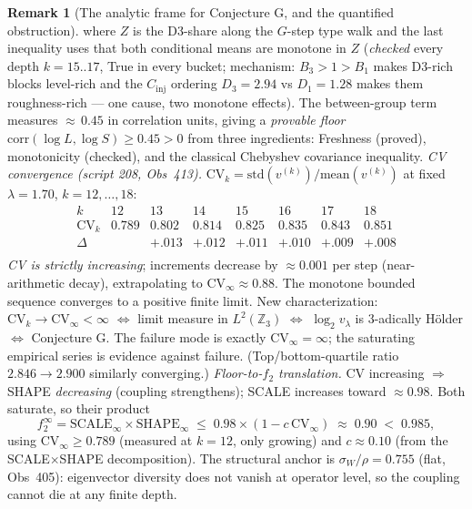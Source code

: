 \documentclass[11pt]{article}
\theoremstyle{definition}
\newtheorem{remark}[theorem]{Remark}
\newcommand{\lam}{\lambda}
\begin{document}
\begin{remark}[The analytic frame for Conjecture G, and the quantified
obstruction]
where $Z$ is the D3-share along the $G$-step type walk and the last
inequality uses that both conditional means are monotone in $Z$
(\emph{checked} every depth $k=15..17$, True in every bucket; mechanism:
$B_3 > 1 > B_1$ makes D3-rich blocks level-rich and the $C_{\mathrm{inj}}$
ordering $D_3 = 2.94$ vs $D_1 = 1.28$ makes them roughness-rich ---
one cause, two monotone effects). The between-group term measures
${\approx}\,0.45$ in correlation units, giving a \emph{provable
floor} $\mathrm{corr}(\log L,\log S) \ge 0.45 > 0$ from three ingredients:
Freshness (proved), monotonicity (checked), and the classical Chebyshev
covariance inequality.
\emph{CV convergence (script 208, Obs~413).} $\mathrm{CV}_k =
\mathrm{std}(v^{(k)})/\mathrm{mean}(v^{(k)})$ at fixed $\lam = 1.70$,
$k = 12,\dots,18$:
\[
\begin{array}{lcccccccc}
k & 12 & 13 & 14 & 15 & 16 & 17 & 18 \\
\mathrm{CV}_k & 0.789 & 0.802 & 0.814 & 0.825 & 0.835 & 0.843 & 0.851 \\
\Delta & & +.013 & +.012 & +.011 & +.010 & +.009 & +.008 \\
\end{array}
\]
\emph{CV is strictly increasing}; increments decrease by $\approx 0.001$
per step (near-arithmetic decay), extrapolating to
$\mathrm{CV}_\infty \approx 0.88$. The monotone bounded sequence converges
to a positive finite limit. New characterization: $\mathrm{CV}_k \to
\mathrm{CV}_\infty < \infty$ $\Leftrightarrow$ limit measure in
$L^2(\mathbb{Z}_3)$ $\Leftrightarrow$ $\log_2 v_\lam$ is $3$-adically
H\"older $\Leftrightarrow$ Conjecture G. The failure mode is exactly
$\mathrm{CV}_\infty = \infty$; the saturating empirical series is evidence
against failure. (Top/bottom-quartile ratio $2.846 \to 2.900$ similarly
converging.)
\emph{Floor-to-$f_2$ translation.} CV increasing $\Rightarrow$ SHAPE
\emph{decreasing} (coupling strengthens); SCALE increases toward $\approx
0.98$. Both saturate, so their product
\[
f_2^\infty = \mathrm{SCALE}_\infty \times \mathrm{SHAPE}_\infty
\;\le\; 0.98 \times (1 - c\,\mathrm{CV}_\infty)
\;\approx\; 0.90 \;<\; 0.985,
\]
using $\mathrm{CV}_\infty \ge 0.789$ (measured at $k=12$, only growing)
and $c \approx 0.10$ (from the SCALE$\times$SHAPE decomposition).
The structural anchor is $\sigma_W/\rho = 0.755$ (flat, Obs~405):
eigenvector diversity does not vanish at operator level, so the coupling
cannot die at any finite depth.


\end{remark}
\end{document}

